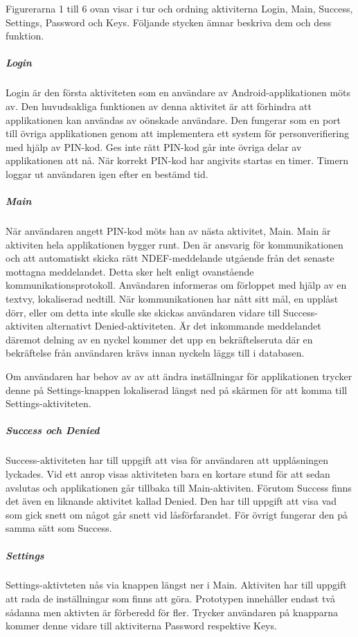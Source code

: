 \documentclass[11pt]{article}
\begin{document}

Figurerarna 1 till 6 ovan visar i tur och ordning aktiviterna Login, Main, Success, Settings, Password och Keys.
Följande stycken ämnar beskriva dem och dess funktion.

\subparagraph{Login}
Login är den första aktiviteten som en användare av Android-applikationen möts av. Den huvudsakliga funktionen av denna aktivitet är att förhindra att applikationen kan användas av oönskade användare. Den fungerar som en port till övriga applikationen genom att implementera ett system för personverifiering med hjälp av PIN-kod. Ges inte rätt PIN-kod går inte övriga delar av applikationen att nå. När korrekt PIN-kod har angivits startas en timer. Timern loggar ut användaren igen efter en bestämd tid. 

\subparagraph{Main}
När användaren angett PIN-kod möts han av nästa aktivitet, Main. Main är aktiviten hela applikationen bygger runt. Den är ansvarig för kommunikationen och att automatiskt skicka rätt NDEF-meddelande utgående från det senaste mottagna meddelandet. Detta sker helt enligt ovanstående kommunikationsprotokoll. Användaren informeras om förloppet med hjälp av en textvy, lokaliserad nedtill. När kommunikationen har nått sitt mål, en upplåst dörr, eller om detta inte skulle ske skickas användaren vidare till Success-aktiviten alternativt Denied-aktiviteten. Är det inkommande meddelandet däremot delning av en nyckel kommer det upp en bekräftelseruta där en bekräftelse från användaren krävs innan nyckeln läggs till i databasen.

Om användaren har behov av av att ändra inställningar för applikationen trycker denne på Settings-knappen lokaliserad längst ned på skärmen för att komma till Settings-aktiviteten.

\subparagraph{Success och Denied}
Success-aktiviteten har till uppgift att visa för användaren att upplåsningen lyckades. Vid ett anrop visas aktiviteten bara en kortare stund för att sedan avslutas och applikationen går tillbaka till Main-aktiviten. Förutom Success finns det även en liknande aktivitet kallad Denied. Den har till uppgift att visa vad som gick snett om något går snett vid låsförfarandet. För övrigt fungerar den på samma sätt som Success.

\subparagraph{Settings}
Settings-aktivteten nås via knappen längst ner i Main. Aktiviten har till uppgift att rada de inställningar som finns att göra. Prototypen innehåller endast två sådanna men aktivten är förberedd för fler. Trycker användaren på knapparna kommer denne vidare till aktiviterna Password respektive Keys.
\end{document}
